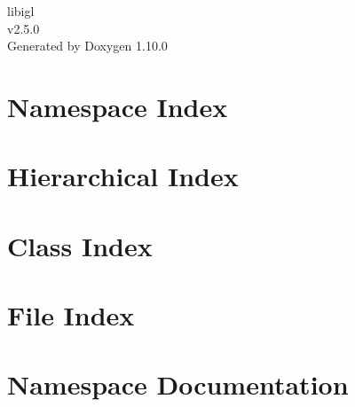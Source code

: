 \documentclass[twoside]{book}
\newcommand{\+}{\discretionary{\mbox{\scriptsize$\hookleftarrow$}}{}{}}
\newcommand{\clearemptydoublepage}{%
    \newpage{\pagestyle{empty}\cleardoublepage}%
  }
\begin{document}
  \raggedbottom
    \hypersetup{pageanchor=false,
                bookmarksnumbered=true,
                pdfencoding=unicode
               }
  \begin{titlepage}
  \vspace*{7cm}
  \begin{center}%
  {\Large libigl}\\
  [1ex]\large v2.\+5.\+0 \\
  \vspace*{1cm}
  {\large Generated by Doxygen 1.10.0}\\
  \end{center}
  \end{titlepage}
  \clearemptydoublepage
  \tableofcontents
  \clearemptydoublepage
  \hypersetup{pageanchor=true}

\chapter{Namespace Index}

\chapter{Hierarchical Index}

\chapter{Class Index}

\chapter{File Index}

\chapter{Namespace Documentation}






















\end{document}
